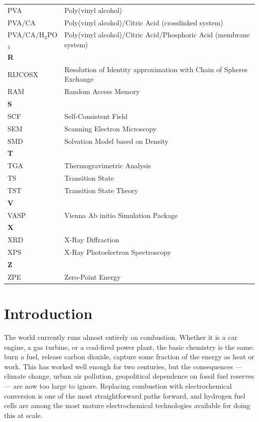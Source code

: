 \documentclass[12pt,a4paper]{report}
\begin{document}
\begin{center}
\begin{longtable}{p{2.5cm} p{12cm}}
PVA & Poly(vinyl alcohol) \\
PVA/CA & Poly(vinyl alcohol)/Citric Acid (crosslinked system) \\
PVA/CA/H\(_3\)PO\(_4\) & Poly(vinyl alcohol)/Citric Acid/Phosphoric Acid (membrane system) \\
\hline
\multicolumn{2}{l}{\textbf{R}} \\
\hline
RIJCOSX & Resolution of Identity approximation with Chain of Spheres Exchange \\
RAM & Random Access Memory \\
\hline
\multicolumn{2}{l}{\textbf{S}} \\
\hline
SCF & Self-Consistent Field \\
SEM & Scanning Electron Microscopy \\
SMD & Solvation Model based on Density \\
\hline
\multicolumn{2}{l}{\textbf{T}} \\
\hline
TGA & Thermogravimetric Analysis \\
TS & Transition State \\
TST & Transition State Theory \\
\hline
\multicolumn{2}{l}{\textbf{V}} \\
\hline
VASP & Vienna Ab initio Simulation Package \\
\hline
\multicolumn{2}{l}{\textbf{X}} \\
\hline
XRD & X-Ray Diffraction \\
XPS & X-Ray Photoelectron Spectroscopy \\
\hline
\multicolumn{2}{l}{\textbf{Z}} \\
\hline
ZPE & Zero-Point Energy \\
\hline
\end{longtable}
\end{center}
\clearpage



\chapter{Introduction}

The world currently runs almost entirely on combustion. 
Whether it is a car engine, a gas turbine, or a coal-fired 
power plant, the basic chemistry is the same: burn a fuel, 
release carbon dioxide, capture some fraction of the energy 
as heat or work. This has worked well enough for two 
centuries, but the consequences — climate change, urban air 
pollution, geopolitical dependence on fossil fuel reserves — 
are now too large to ignore. Replacing combustion with 
electrochemical conversion is one of the most 
straightforward paths forward, and hydrogen fuel cells are 
among the most mature electrochemical technologies available 
for doing this at scale.\cite{1,2}
\end{document}
